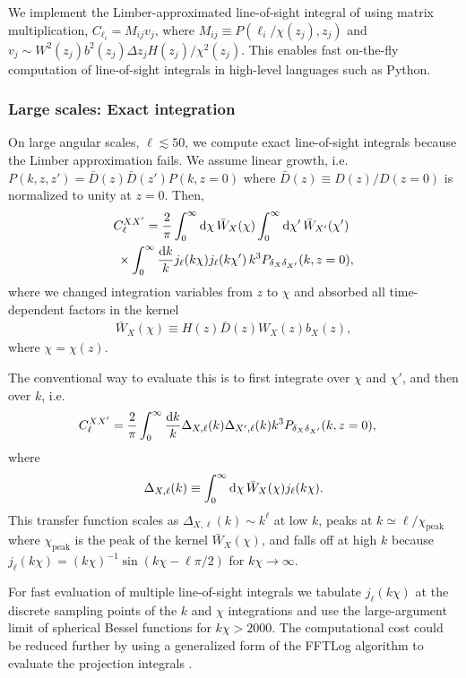 \documentclass[prd,superscriptaddress,floatfix,notitlepage,nofootinbib,reprint]{revtex4-1} %
\begin{document}
We implement the Limber-approximated line-of-sight integral of  using matrix multiplication, $C_{\ell_i}=M_{ij}v_j$, where $M_{ij}\equiv P(\ell_i/\chi(z_j),z_j)$ and $v_j\sim W^2(z_j)b^2(z_j)\Delta z_jH(z_j)/\chi^2(z_j)$.
This enables fast on-the-fly computation of line-of-sight integrals in high-level languages such as Python.

\subsubsection{Large scales: Exact integration}
\label{app:FullLOS}

On large angular scales, $\ell\lesssim 50$, we compute exact line-of-sight integrals  because the Limber approximation fails. 
We assume linear growth, i.e.~$P(k,z,z')=\bar D(z)\bar D(z')P(k,z=0)$ where $\bar D(z)\equiv D(z)/D(z=0)$ is normalized to unity at $z=0$.
Then,
\begin{align}
  \label{eq:32}
&  C_\ell^{XX'}  = 
\frac{2}{\pi}\int_0^\infty\mathrm{d} \chi\,\bar W_{X}(\chi)
\int_0^\infty \mathrm{d} \chi'\,
\bar W_{X'}(\chi')\nonumber\\
&\;\times
\int_0^\infty\frac{\mathrm{d} k}{k} j_\ell(k\chi)j_\ell(k\chi')\,k^3P_{\delta_X\delta_{X'}}(k,z=0),
\end{align}
where we changed integration variables from $z$ to $\chi$ and absorbed all time-dependent factors in the kernel 
\begin{align}
  \label{eq:44}
\bar W_X(\chi)\equiv H(z)\bar D(z)W_X(z)b_X(z),  
\end{align}
where $\chi=\chi(z)$.


The conventional way to evaluate this is to first integrate over $\chi$ and $\chi'$, and then over $k$, i.e.
\begin{align}
  \label{eq:42}
&  C_\ell^{XX'}  = 
\frac{2}{\pi}
\int_0^\infty\frac{\mathrm{d} k}{k} \Delta_{X,\ell}(k)\Delta_{X',\ell}(k)k^3P_{\delta_X\delta_{X'}}(k,z=0),
\end{align}
where
\begin{align}
  \label{eq:43}
  \Delta_{X,\ell}(k) \equiv \int_0^\infty\mathrm{d}\chi\,\bar W_X(\chi)j_\ell(k\chi).
\end{align}
This transfer function scales as $\Delta_{X,\ell}(k)\sim k^\ell$ at low $k$, peaks at $k\simeq \ell/\chi_\mathrm{peak}$ where $\chi_\mathrm{peak}$ is the peak of the kernel $\bar W_X(\chi)$, and falls off at high $k$ because $j_\ell(k\chi)= (k\chi)^{-1}\sin(k\chi-\ell\pi/2)$ for $k\chi\rightarrow\infty$.

For fast evaluation of multiple line-of-sight integrals we tabulate $j_\ell(k\chi)$ at the discrete sampling points of the $k$ and $\chi$ integrations and use the large-argument limit of spherical Bessel functions for $k\chi>2000$.
The computational cost could be reduced further by using a generalized form of the FFTLog algorithm \cite{hamiltonfftlog} to evaluate the projection integrals \cite{Assassi:2017lea}.
\end{document}
